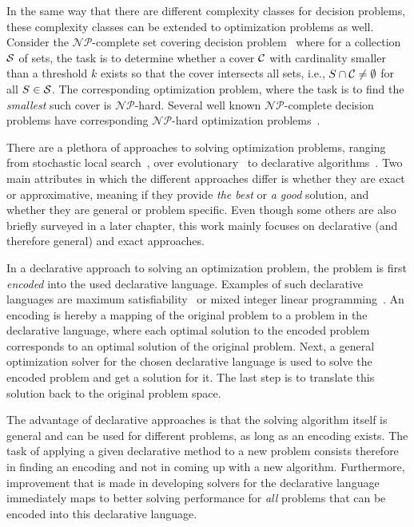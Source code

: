 In the same way that there are different complexity classes for decision problems, these complexity classes can be extended to optimization problems as well.
Consider the $\mathcal{NP}$-complete set covering decision problem~\autocite{DBLP:conf/coco/Karp72} where for a collection $\mathcal{S}$ of sets, the task is to determine whether a cover $\mathcal{C}$ with cardinality smaller than a threshold $k$ exists so that the cover intersects all sets, i.e., $S \cap \mathcal{C} \neq \emptyset$ for all $S\in\mathcal{S}$.
The corresponding optimization problem, where the task is to find the \emph{smallest} such cover is $\mathcal{NP}$-hard.
Several well known $\mathcal{NP}$-complete decision problems have corresponding $\mathcal{NP}$-hard optimization problems~\autocite{KorteVygen2018-15}.

There are a plethora of approaches to solving optimization problems, ranging from stochastic local search~\autocite{}, over evolutionary~\autocite{Dasgupta2013,DBLP:journals/jgo/StornP97} to declarative algorithms~\autocite{}.
Two main attributes in which the different approaches differ is whether they are exact or approximative, meaning if they provide \emph{the best} or \emph{a good} solution, and whether they are general or problem specific.
Even though some others are also briefly surveyed in a later chapter, this work mainly focuses on declarative (and therefore general) and exact approaches.

In a declarative approach to solving an optimization problem, the problem is first \emph{encoded} into the used declarative language.
Examples of such declarative languages are maximum satisfiability~\autocite{handbook2-maxsat} or mixed integer linear programming~\autocite{ChenEtAl2010AppliedIntegerProgramming,KorteVygen2018-5}.
An encoding is hereby a mapping of the original problem to a problem in the declarative language, where each optimal solution to the encoded problem corresponds to an optimal solution of the original problem.
Next, a general optimization solver for the chosen declarative language is used to solve the encoded problem and get a solution for it.
The last step is to translate this solution back to the original problem space.

The advantage of declarative approaches is that the solving algorithm itself is general and can be used for different problems, as long as an encoding exists.
The task of applying a given declarative method to a new problem consists therefore in finding an encoding and not in coming up with a new algorithm.
Furthermore, improvement that is made in developing solvers for the declarative language immediately maps to better solving performance for \emph{all} problems that can be encoded into this declarative language.

